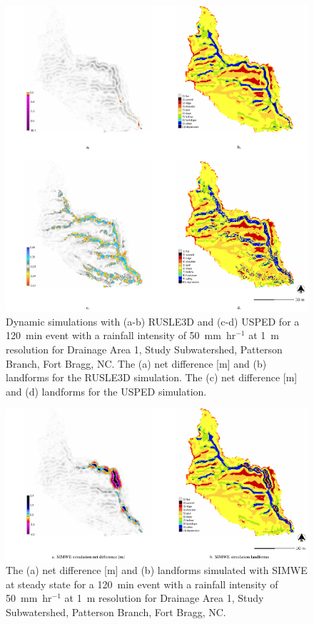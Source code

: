 \documentclass[gmd, manuscript]{copernicus}
\begin{document}

\begin{figure}
\center
\includegraphics[width=\textwidth,height=0.925\textheight,keepaspectratio]{figures/simulations.pdf}
\caption{Dynamic simulations with (a-b) RUSLE3D and (c-d) USPED
for a 120~\unit{min} event with a rainfall intensity of 50~\unit{mm~hr}$^{-1}$
at 1~\unit{m} resolution for
Drainage Area 1, Study Subwatershed, Patterson Branch, Fort Bragg, NC.
The (a) net difference [\unit{m}] and 
(b) landforms for the RUSLE3D simulation.
The (c) net difference [\unit{m}] and 
(d) landforms for the USPED simulation.
}
\label{fig:simulations}
\end{figure}

\begin{figure}
\center
\includegraphics[width=\textwidth,height=0.95\textheight,keepaspectratio]{figures/simwe.pdf}
\caption{
The (a) net difference [\unit{m}] and
(b) landforms
simulated with SIMWE at steady state 
for a 120~\unit{min} event with a rainfall intensity of 50~\unit{mm~hr}$^{-1}$
at 1~\unit{m} resolution for
Drainage Area 1, Study Subwatershed, Patterson Branch, Fort Bragg, NC.
}
\label{fig:simwe_simulations}
\end{figure}
\end{document}
